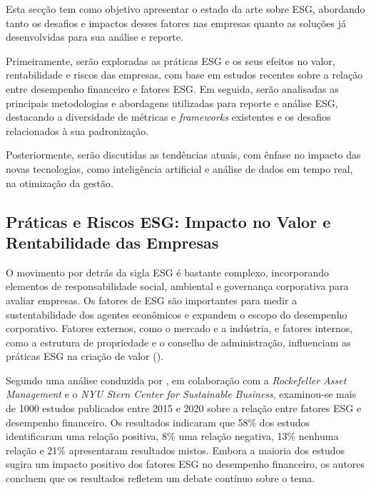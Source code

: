 Esta secção tem como objetivo apresentar o estado da arte sobre \gls{ESG}, abordando tanto os desafios e impactos desses fatores nas empresas quanto as soluções já desenvolvidas para sua análise e reporte.  

Primeiramente, serão exploradas as práticas \gls{ESG} e os seus efeitos no valor, rentabilidade e riscos das empresas, com base em estudos recentes sobre a relação entre desempenho financeiro e fatores \gls{ESG}. Em seguida, serão analisadas as principais metodologias e abordagens utilizadas para reporte e análise \gls{ESG}, destacando a diversidade de métricas e \textit{frameworks} existentes e os desafios relacionados à sua padronização.  

Posteriormente, serão discutidas as tendências atuais, com ênfase no impacto das novas tecnologias, como inteligência artificial e análise de dados em tempo real, na otimização da gestão.


\subsection{Práticas e Riscos \gls{ESG}: Impacto no Valor e Rentabilidade das Empresas}
\label{subsec:PESGE}

O movimento por detrás da sigla \gls{ESG} é bastante complexo, incorporando elementos de responsabilidade social, ambiental e governança corporativa para avaliar empresas. Os fatores de \gls{ESG} são importantes para medir a sustentabilidade dos agentes econômicos e expandem o escopo do desempenho corporativo. Fatores externos, como o mercado e a indústria, e fatores internos, como a estrutura de propriedade e o conselho de administração, influenciam as práticas \gls{ESG} na criação de valor (\cite{Wang2023}).

Segundo uma análise conduzida por \cite{Whelan2021}, em colaboração com a \textit{Rockefeller Asset Management} e o \textit{NYU Stern Center for Sustainable Business}, examinou-se mais de 1000 estudos publicados entre 2015 e 2020 sobre a relação entre fatores \gls{ESG} e desempenho financeiro. Os resultados indicaram que 58\% dos estudos identificaram uma relação positiva, 8\% uma relação negativa, 13\% nenhuma relação e 21\% apresentaram resultados mistos. Embora a maioria dos estudos sugira um impacto positivo dos fatores \gls{ESG} no desempenho financeiro, os autores concluem que os resultados refletem um debate contínuo sobre o tema.

